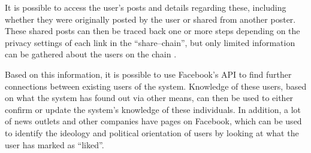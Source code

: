 It is possible to access the user's posts and details regarding these, including whether they were originally
posted by the user or shared from another poster.
These shared posts can then be traced back one or more steps depending on the
privacy settings of each link in the ``share--chain'', but only limited
information can be gathered about the users on the chain \citep{FacebookGraphApiUserFeed}.\nl

Based on this information, it is possible to use Facebook's API to find
further connections between existing users of the system.
Knowledge of these users, based on what the system has found out via other means, can then be used to either confirm
or update the system's knowledge of these individuals.
In addition, a lot of news outlets and other companies have pages on Facebook,
which can be used to identify the ideology and political orientation of
users by looking at what the user has marked as ``liked''.
